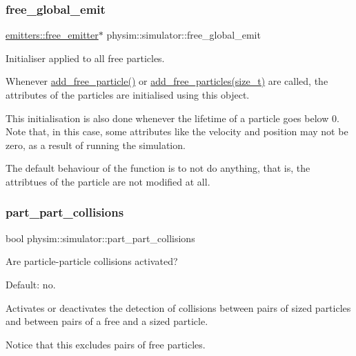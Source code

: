 \subsubsection{\texorpdfstring{free\+\_\+global\+\_\+emit}{free\_global\_emit}}
{\footnotesize\ttfamily \hyperlink{classphysim_1_1emitters_1_1free__emitter}{emitters\+::free\+\_\+emitter}$\ast$ physim\+::simulator\+::free\+\_\+global\+\_\+emit\hspace{0.3cm}{\ttfamily [private]}}



Initialiser applied to all free particles. 

Whenever \hyperlink{classphysim_1_1simulator_a6d2b636673f895b006724a6ba310e322}{add\+\_\+free\+\_\+particle()} or \hyperlink{classphysim_1_1simulator_a8729cd8c3590730d8897f61f2320f3e8}{add\+\_\+free\+\_\+particles(size\+\_\+t)} are called, the attributes of the particles are initialised using this object.

This initialisation is also done whenever the lifetime of a particle goes below 0. Note that, in this case, some attributes like the velocity and position may not be zero, as a result of running the simulation.

The default behaviour of the function is to not do anything, that is, the attribtues of the particle are not modified at all. \mbox{\label{classphysim_1_1simulator_a4a7d02feac1ca57bb143b70ad8b81134}} 
\subsubsection{\texorpdfstring{part\+\_\+part\+\_\+collisions}{part\_part\_collisions}}
{\footnotesize\ttfamily bool physim\+::simulator\+::part\+\_\+part\+\_\+collisions\hspace{0.3cm}{\ttfamily [private]}}



Are particle-\/particle collisions activated? 

Default\+: no.

Activates or deactivates the detection of collisions between pairs of sized particles and between pairs of a free and a sized particle.

Notice that this excludes pairs of free particles. \mbox{\label{classphysim_1_1simulator_a7ea652d4a55986d0c2cf527e40495fd8}} 
